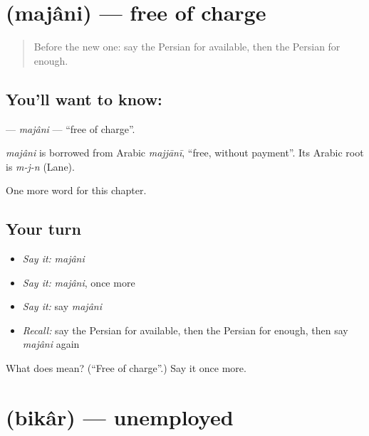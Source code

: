 \section[\texorpdfstring{\fa{مجانی} (majâni)}{مجانی (majâni)}]{ (majâni) — free of charge}

\label{lesson:FA-C235-majani}



\begin{quote}
Before the new one: say the Persian for available, then the Persian for enough.
\end{quote}

\subsection*{You'll want to know: }
\textbf{} — \emph{majâni} — \textquotedblleft{}free of charge\textquotedblright{}.

\begin{cousinweb}
\emph{majâni} is borrowed from Arabic \emph{majjānī}, \textquotedblleft{}free, without payment\textquotedblright{}. Its Arabic root is \emph{m-j-n} (Lane).
\end{cousinweb}

\begin{grammarlens}[title={What you've built}]
One more word for this chapter.
\end{grammarlens}

\subsection*{Your turn}
\begin{itemize}
\raggedright
  \item \emph{Say it:} \emph{majâni}
  \item \emph{Say it:} \emph{majâni}, once more
  \item \emph{Say it:} say \emph{majâni}
  \item \emph{Recall:} say the Persian for available, then the Persian for enough, then say \emph{majâni} again
\end{itemize}

\begin{tcolorbox}[breakable,colback=teal!4,colframe=teal!35!black,title={Before you move on}]
What does  mean? (\textquotedblleft{}Free of charge\textquotedblright{}.) Say it once more.
\end{tcolorbox}
\section[\texorpdfstring{\fa{بیکار} (bikâr)}{بیکار (bikâr)}]{ (bikâr) — unemployed}

